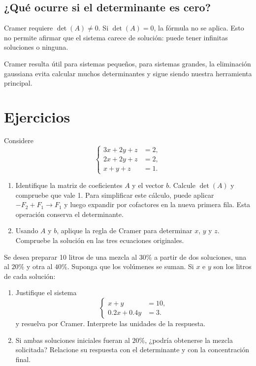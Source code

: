 \documentclass[compacto,10pt]{pubciencias-notas}
\begin{document}
\subsection{¿Qué ocurre si el determinante es cero?}

\begin{advertencia}
    Cramer requiere $\det(A)\ne0$. Si $\det(A)=0$, la fórmula no se aplica.
    Esto no permite afirmar que el sistema carece de solución: puede tener infinitas soluciones o ninguna.
\end{advertencia}

Cramer resulta útil para sistemas pequeños, para sistemas grandes, la eliminación gaussiana evita calcular muchos determinantes y sigue siendo nuestra herramienta principal.

\section{Ejercicios}

\begin{ejer}
    Considere
    \[
        \left\{\begin{aligned}
            3x+2y+z&=2,\\2x+2y+z&=2,\\x+y+z&=1.
        \end{aligned}\right.
    \]
    \begin{enumerate}
              \item Identifique la matriz de coeficientes
              $A$ y el vector $b$. Calcule $\det(A)$ y compruebe que vale 1.
              Para simplificar este cálculo, puede aplicar
              $-F_2+F_1\rightarrow F_1$ y luego expandir por cofactores en la nueva primera fila. Esta operación conserva el
              determinante.
        \item Usando $A$ y $b$, aplique la regla de Cramer para determinar $x$, $y$ y $z$. Compruebe la solución en las tres ecuaciones originales.
    \end{enumerate}
\end{ejer}

\begin{ejer}
    Se desea preparar 10 litros de una mezcla al $30\%$ a partir de dos soluciones, una al $20\%$ y otra al $40\%$. Suponga que los volúmenes se suman. Si $x$ e $y$ son los litros de cada solución:
    \begin{enumerate}
            \item Justifique el sistema
              \[
                  \left\{\begin{aligned}
                      x+y&=10,\\
                      0.2x+0.4y&=3.
                  \end{aligned}\right.
              \]
        y resuelva por Cramer. Interprete las unidades de la respuesta.
        \item Si ambas soluciones iniciales fueran al $20\%$, ¿podría
              obtenerse la mezcla solicitada? Relacione su respuesta con
              el determinante y con la concentración final.
    \end{enumerate}
\end{ejer}
\end{document}
